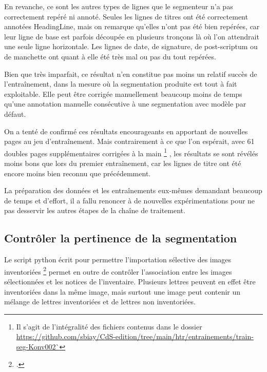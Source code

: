 \documentclass[a4paper,12pt,twoside]{book}
\begin{document}
    			En revanche, ce sont les autres types de lignes que le segmenteur n'a pas correctement repéré ni annoté. Seules les lignes de titres ont été correctement annotées \textsf{HeadingLine}, mais on remarque qu'elles n'ont pas été bien repérées, car leur ligne de base est parfois découpée en plusieurs tronçons là où l'on attendrait une seule ligne horizontale. Les lignes de date, de signature, de post-scriptum ou de manchette ont quant à elle été très mal ou pas du tout repérées.
    			
    			Bien que très imparfait, ce résultat n'en constitue pas moins un relatif succès de l'entraînement, dans la mesure où la {segmentation} produite est tout à fait exploitable. Elle peut être corrigée manuellement beaucoup moins de temps qu'une annotation manuelle consécutive à une {segmentation} avec modèle par défaut.
    			
    			On a tenté de confirmé ces résultats encourageants en apportant de nouvelles pages au jeu d'entraînement. Mais contrairement à ce que l'on espérait, avec 61 doubles pages supplémentaires corrigées à la main
    			\footnote{Il s'agit de l'intégralité des fichiers contenus dans le dossier \url{https://github.com/sbiay/CdS-edition/tree/main/htr/entrainements/train-seg-Konv002`}}
    			, les résultats se sont révélés moins bons que lors du premier entraînement, car les lignes de titre ont été encore moins bien reconnu que précédemment. 
    			
    			La préparation des données et les entraînements eux-mêmes demandant beaucoup de temps et d'effort, il a fallu renoncer à de nouvelles expérimentations pour ne pas desservir les autres étapes de la chaîne de traitement.

	    		
	    	\subsection{Contrôler la pertinence de la \gls{segmentation}}
		    	\label{controle-segmentation-lettres-inventoriees}
	    		
	    		Le script python écrit pour permettre l'importation sélective des images inventoriées \footcite{biayDonneesImagesPy2022} permet en outre de contrôler l'association entre les images sélectionnées et les notices de l'inventaire. Plusieurs lettres peuvent en effet être inventoriées dans la même image, mais surtout une image peut contenir un mélange de lettres inventoriées et de lettres non inventoriées.
	    		
\end{document}

